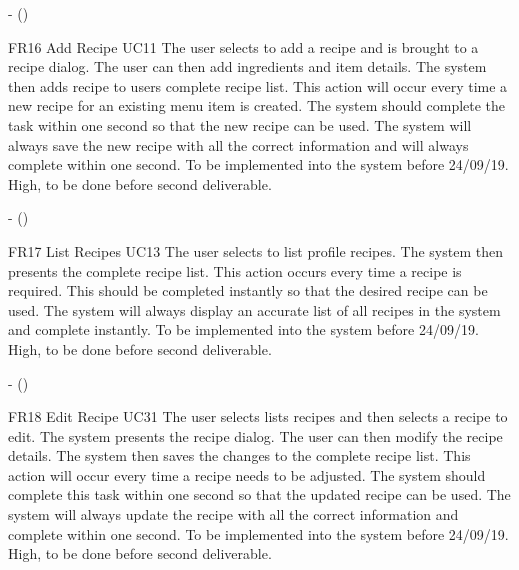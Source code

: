\noindent \textbf{} -  ()\\
\begin{small}
	
\end{small}
\linebreak

FR16
Add Recipe
UC11
The user selects to add a recipe and is brought to a recipe dialog. The user can then add ingredients and item details. The system then adds recipe to users complete recipe list. This action will occur every time a new recipe for an existing menu item is created. The system should complete the task within one second so that the new recipe can be used. The system will always save the new recipe with all the correct information and will always complete within one second. To be implemented into the system before 24/09/19. 
High, to be done before second deliverable.

\noindent \textbf{} -  ()\\
\begin{small}
	
\end{small}
\linebreak

FR17
List Recipes
UC13
The user selects to list profile recipes. The system then presents the complete recipe list. This action occurs every time a recipe is required. This should be completed instantly so that the desired recipe can be used. The system will always display an accurate list of all recipes in the system and complete instantly. To be implemented into the system before 24/09/19.
High, to be done before second deliverable.

\noindent \textbf{} -  ()\\
\begin{small}
	
\end{small}
\linebreak

FR18
Edit Recipe
UC31
The user selects lists recipes and then selects a recipe to edit. The system presents the recipe dialog. The user can then modify the recipe details. The system then saves the changes to the complete recipe list. This action will occur every time a recipe needs to be adjusted. The system should complete this task within one second so that the updated recipe can be used. The system will always update the recipe with all the correct information and complete within one second. To be implemented into the system before 24/09/19.
High, to be done before second deliverable.

